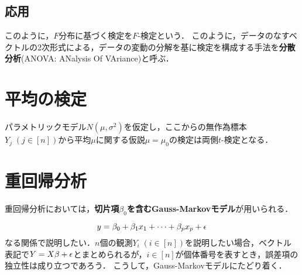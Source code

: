 \documentclass[uplatex,dvipdfmx]{jsreport}
\begin{document}
\begin{proposition}
    
\end{proposition}

\subsection{応用}

\begin{tcolorbox}[colframe=ForestGreen, colback=ForestGreen!10!white,breakable,colbacktitle=ForestGreen!40!white,coltitle=black,fonttitle=\bfseries\sffamily,
title=]
    このように，$F$分布に基づく検定を$F$-検定という．
    このように，データのなすベクトルの2次形式による，データの変動の分解を基に検定を構成する手法を\textbf{分散分析}(ANOVA: ANalysis Of VAriance)と呼ぶ．
\end{tcolorbox}

\section{平均の検定}

\begin{tcolorbox}[colframe=ForestGreen, colback=ForestGreen!10!white,breakable,colbacktitle=ForestGreen!40!white,coltitle=black,fonttitle=\bfseries\sffamily,
title=]
    パラメトリックモデル$N(\mu,\sigma^2)$を仮定し，ここからの無作為標本$Y_j\;(j\in[n])$から平均$\mu$に関する仮説$\mu=\mu_0$の検定は両側$t$-検定となる．
\end{tcolorbox}

\section{重回帰分析}

\begin{tcolorbox}[colframe=ForestGreen, colback=ForestGreen!10!white,breakable,colbacktitle=ForestGreen!40!white,coltitle=black,fonttitle=\bfseries\sffamily,
title=]
    重回帰分析においては，\textbf{切片項$\beta_0$を含むGauss-Markovモデル}が用いられる．
\end{tcolorbox}

\begin{discussion}
    \[y=\beta_0+\beta_1x_1+\cdots+\beta_px_p+\epsilon\]
    なる関係で説明したい．$n$個の観測$Y_i\;(i\in[n])$を説明したい場合，ベクトル表記で$Y=X\beta+\epsilon$とまとめられるが，$i\in[n]$が個体番号を表すとき，誤差項の独立性は成り立つであろう．
    こうして，Gauss-Markovモデルにたどり着く．
\end{discussion}
\end{document}

